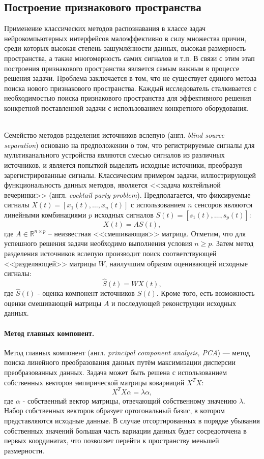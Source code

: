 \documentclass[12pt,a4paper,oneside,fleqn,leqno]{article}
\newcounter{pe} %
\newcommand*{\Nep}{\addtocounter{pe}{1}{\arabic{pe}$^{\circ}$.\;}}
\newcommand*{\NepS}{\mbox{} \\ \Nep}
\begin{document}
	\subsection{Построение признакового пространства}
	\par Применение классических методов распознавания в классе задач нейрокомпьютерных интерфейсов малоэффективно в силу множества причин, среди которых высокая степень зашумлённости данных, высокая размерность пространства, а также многомерность самих сигналов и т.п. В связи с этим этап построения признакового пространства является самым важным в процессе решения задачи. Проблема заключается в том, что не существует единого метода поиска нового признакового пространства. Каждый исследователь сталкивается с необходимостью поиска признакового пространства для эффективного решения конкретной поставленной задачи с использованием конкретного оборудования. \\
	\setcounter{pe}{0}
	\NepS {\bf Разделение источников вслепую}
	\par Семейство методов разделения источников вслепую (англ. {\it blind source separation}) основано на предположении о том, что регистрируемые сигналы для мультиканального устройства являются смесью сигналов из различных источников, и является попыткой выделить исходные источники, преобразуя зарегистрированные сигналы. Классическим примером задачи, иллюстрирующей функциональность данных методов, яволяется <<задача коктейльной вечеринки>> (англ. {\it cocktail party problem}). Предполагается, что фиксируемые сигналы $X(t) = [x_1(t), \dots, x_n(t)]$ с использованием $n$ сенсоров являются линейными комбинациями $p$ исходных сигналов $S(t) = [s_1(t), \dots, s_p(t)]$:
$$X(t) = AS(t),$$
	где $A \in \mathbb{R}^{n \times p}$ -- неизвестная <<смешивающая>> матрица. Отметим, что для успешного решения задачи необходимо выполнения условия $n \geqslant p.$ Затем метод разделения источников вслепую производит поиск соответствующей <<разделяющей>> матрицы $W$, наилучшим образом оценивающей исходные сигналы:
$$\widehat{S}(t) = WX(t),$$
	где $\widehat{S}(t)$ - оценка компонент источников $S(t)$. Кроме того, есть возможность оценки смешивающей матрицы $A$ и последующей реконструции исходных данных.
	\paragraph{Метод главных компонент.}
	\par Метод главных компонент (англ. {\it principal component analysis, PCA}) — метод поиска линейного преобразования данных путём максимизации дисперсии преобразованных данных. Задача может быть решена с использованием собственных векторов эмпирической матрицы ковариаций $X^TX$:
$$X^TX \alpha = \lambda \alpha,$$
	где $\alpha$ - собственный вектор матрицы, отвечающий собственному значению $\lambda$. Набор собственных векторов образует ортогональный базис, в котором представляются исходные данные. В случае отсортированных в порядке убывания собственных значений большая часть вариации данных будет сосредоточена в первых координатах, что позволяет перейти к пространству меньшей размерности.
\end{document}
